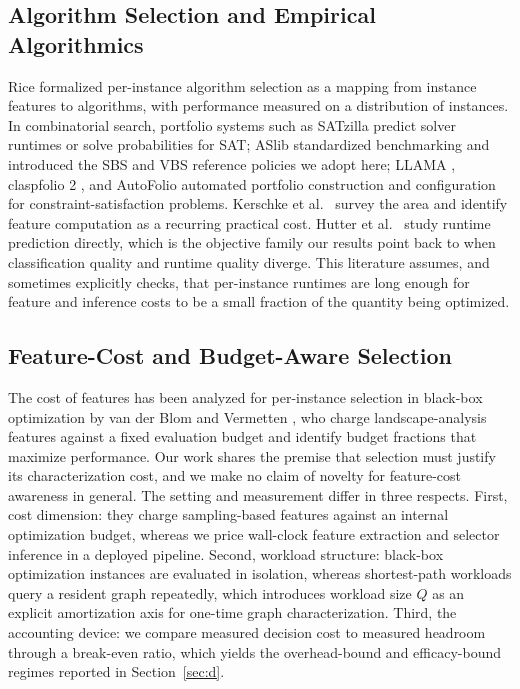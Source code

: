 \documentclass[conference]{IEEEtran}
\begin{document}
\subsection{Algorithm Selection and Empirical Algorithmics}
Rice \cite{rice1976} formalized per-instance algorithm selection as a mapping from instance features to algorithms, with performance measured on a distribution of instances. In combinatorial search, portfolio systems such as SATzilla \cite{xu2008, hutter2014} predict solver runtimes or solve probabilities for SAT; ASlib \cite{bischl2016} standardized benchmarking and introduced the SBS and VBS reference policies we adopt here; LLAMA \cite{kotthoff2014}, claspfolio 2 \cite{gebser2014}, and AutoFolio \cite{lindauer2015} automated portfolio construction and configuration for constraint-satisfaction problems. Kerschke et al.\ \cite{kerschke2019} survey the area and identify feature computation as a recurring practical cost. Hutter et al.\ \cite{hutter2014} study runtime prediction directly, which is the objective family our results point back to when classification quality and runtime quality diverge. This literature assumes, and sometimes explicitly checks, that per-instance runtimes are long enough for feature and inference costs to be a small fraction of the quantity being optimized.

\subsection{Feature-Cost and Budget-Aware Selection}
The cost of features has been analyzed for per-instance selection in black-box optimization by van der Blom and Vermetten \cite{vanderblom2026}, who charge landscape-analysis features against a fixed evaluation budget and identify budget fractions that maximize performance. Our work shares the premise that selection must justify its characterization cost, and we make no claim of novelty for feature-cost awareness in general. The setting and measurement differ in three respects. First, cost dimension: they charge sampling-based features against an internal optimization budget, whereas we price wall-clock feature extraction and selector inference in a deployed pipeline. Second, workload structure: black-box optimization instances are evaluated in isolation, whereas shortest-path workloads query a resident graph repeatedly, which introduces workload size $Q$ as an explicit amortization axis for one-time graph characterization. Third, the accounting device: we compare measured decision cost to measured headroom through a break-even ratio, which yields the overhead-bound and efficacy-bound regimes reported in Section~\ref{sec:d}.
\end{document}
